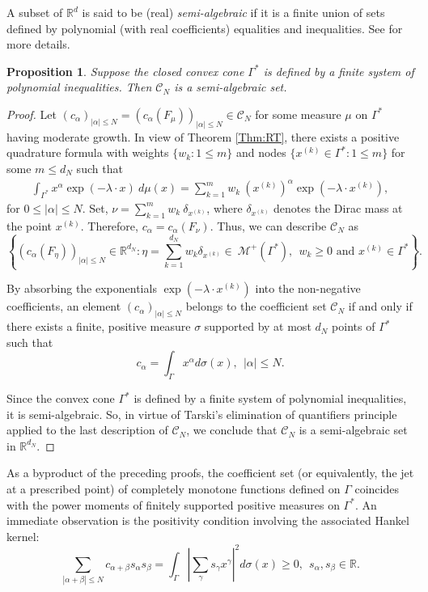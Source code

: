 \documentclass[11pt,reqno]{amsart}
\theoremstyle{plain}
\newtheorem{proposition}[theorem]{Proposition}
\theoremstyle{definition}
\numberwithin{equation}{section}
\begin{document}
    A subset of $\mathbb{R}^d$ is said to be (real) {\em semi-algebraic} if it is a finite union of sets defined by polynomial (with real coefficients) equalities and inequalities. See \cite[Chapter 2]{BCR} for more details.
	\begin{proposition} \label{coefficient}
	Suppose the closed convex cone $\Gamma^*$ is defined by a finite system of polynomial inequalities. Then $\mathcal{C}_N$ is a semi-algebraic set.
   
	\end{proposition}
	\begin{proof}
		Let $(c_{\alpha})_{|\alpha | \leq N} = (c_{\alpha}(F_\mu))_{|\alpha| \leq N}  \in \mathcal{C}_N$ for some measure $\mu$ on $\Gamma^*$ having moderate growth.
         In view of Theorem \ref{Thm:RT}, there exists a positive quadrature formula with weights $\{w_k: 1\leq m\}$ and nodes $\{ x^{(k)} \in \Gamma^*: 1\leq m\}$ for some $m \leq d_N$ such that 
		\begin{align}
			\int_{\Gamma^*} x^\alpha \exp(- \lambda \cdot x)\ d\mu(x) = \sum_{k=1}^{m} w_k \ (x^{(k)})^\alpha \exp(-\lambda \cdot x^{(k)}),
		\end{align}
		for $0 \leq |\alpha| \leq N$. Set, $\nu = \sum_{k=1}^{m} w_k\ \delta_{x^{(k)}}$, where $\delta_{x^{(k)}}$ denotes the Dirac mass at the point $x^{(k)}$. Therefore, $c_{\alpha} = c_{\alpha}(F_\nu)$.
		Thus, we can describe $\mathcal{C}_N$ as 
		$$
		\left \lbrace (c_{\alpha}(F_\eta) )_{ |\alpha| \leq N} \in \mathbb{R}^{d_N} : \eta = \sum_{k=1}^{d_N} w_k \delta_{x^{(k)}} \in \ \mathcal{M}^+(\Gamma^*), \ \ w_k \geq 0 \text{ and } x^{(k)} \in \Gamma^* \right \rbrace.
		$$

By absorbing the exponentials  $\exp(-\lambda \cdot x^{(k)})$ into the non-negative coefficients, an element $(c_{\alpha} )_{|\alpha| \leq N}$ belongs to  the coefficient set $\mathcal{C}_N$ if and only if there exists a finite, positive measure $\sigma$ supported by at most $d_N$ points of $\Gamma^\ast$ such that
		$$ 
        c_\alpha = \int_\Gamma x^\alpha d\sigma(x), \ \ |\alpha| \leq N.
        $$

        
		Since the convex cone $\Gamma^*$ is defined by a finite system of polynomial inequalities, it is semi-algebraic. So, in virtue of  Tarski's  elimination of quantifiers principle \cite{BCR} applied to the last description of $\mathcal{C}_N$, we conclude that $\mathcal{C}_N$ is a semi-algebraic set in $\mathbb{R}^{d_N}$.
	\end{proof}

	As a byproduct of the preceding proofs, the coefficient set (or equivalently, the jet at a prescribed point) of completely monotone functions defined on $\Gamma$ coincides with the power moments of finitely supported positive measures on $\Gamma^*$. An immediate observation is the positivity condition involving the associated Hankel kernel:
	$$ \sum_{|\alpha +\beta| \leq N} c_{\alpha + \beta} s_\alpha s_\beta =  \int_\Gamma |\sum_\gamma s_\gamma x^\gamma|^2 d\sigma(x) \geq 0, \ \ s_\alpha, s_\beta \in {\mathbb R}.$$
	
\end{document}
